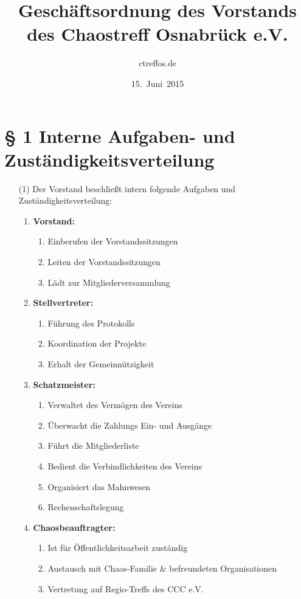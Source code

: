 \documentclass[a4paper,12pt]{scrartcl}
\title{Geschäftsordnung des Vorstands des Chaostreff Osnabrück e.V.}
\author{ctreffos.de}
\date{15.~Juni~2015}
\begin{document}
\maketitle

\section*{\S{} 1 Interne Aufgaben- und Zuständigkeitsverteilung}
\begin{enumerate}
\item[(1)]
Der Vorstand beschließt intern folgende Aufgaben und Zuständigkeitsverteilung:

\begin{enumerate}
\item \textbf{Vorstand:}
\begin{enumerate}
\item Einberufen der Vorstandssitzungen
\item Leiten der Vorstandssitzungen
\item Lädt zur Mitgliederversammlung
\end{enumerate}

\item \textbf{Stellvertreter:}
\begin{enumerate}
\item Führung des Protokolls
\item Koordination der Projekte
\item Erhalt der Gemeinnützigkeit
\end{enumerate}

\item \textbf{Schatzmeister:}
\begin{enumerate}
\item Verwaltet des Vermögen des Vereins
\item Überwacht die Zahlungs Ein- und Ausgänge
\item Führt die Mitgliederliste
\item Bedient die Verbindlichkeiten des Vereins
\item Organisiert das Mahnwesen
\item Rechenschaftslegung
\end{enumerate}

\item \textbf{Chaosbeauftragter:}
\begin{enumerate}
\item Ist für Öffentlichkeitsarbeit zuständig
\item Austausch mit Chaos-Familie \& befreundeten Organisationen
\item Vertretung auf Regio-Treffs des CCC e.V.
\end{enumerate}


\end{enumerate}
\end{enumerate}
\end{document}
